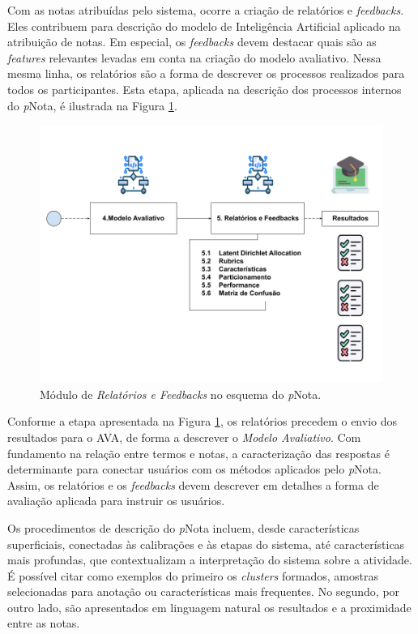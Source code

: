 Com as notas atribuídas pelo sistema, ocorre a criação de relatórios e \textit{feedbacks}. Eles contribuem para descrição do modelo de Inteligência Artificial aplicado na atribuição de notas. Em especial, os \textit{feedbacks} devem destacar quais são as \textit{features} relevantes levadas em conta na criação do modelo avaliativo. Nessa mesma linha, os relatórios são a forma de descrever os processos realizados para todos os participantes. Esta etapa, aplicada na descrição dos processos internos do \textit{p}Nota, é ilustrada na Figura \ref{fig-rf}. 

\begin{figure}[!h]
\centering
\includegraphics[width=\textwidth]{figuras/esquema-rf-pNota.png}
\caption{Módulo de \textit{Relatórios e Feedbacks} no esquema do \textit{p}Nota.}
\label{fig-rf}
\end{figure}


Conforme a etapa apresentada na Figura \ref{fig-rf}, os relatórios precedem o envio dos resultados para o AVA, de forma a descrever o \textit{Modelo Avaliativo}. Com fundamento na relação entre termos e notas, a caracterização das respostas é determinante para conectar usuários com os métodos aplicados pelo \textit{p}Nota. Assim, os relatórios e os \textit{feedbacks} devem descrever em detalhes a forma de avaliação aplicada para instruir os usuários.

Os procedimentos de descrição do \textit{p}Nota incluem, desde características superficiais, conectadas às calibrações e às etapas do sistema, até características mais profundas, que contextualizam a interpretação do sistema sobre a atividade. É possível citar como exemplos do primeiro os \textit{clusters} formados, amostras selecionadas para anotação ou características mais frequentes. No segundo, por outro lado, são apresentados em linguagem natural os resultados e a proximidade entre as notas.


